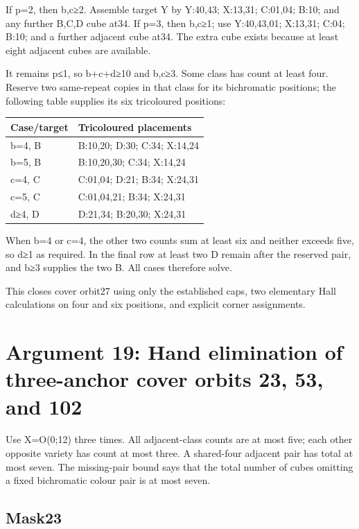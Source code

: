 \documentclass[
  10pt,
]{article}
\begin{document}
If p=2, then b,c≥2. Assemble target Y by Y:40,43; X:13,31; C:01,04;
B:10; and any further B,C,D cube at34. If p=3, then b,c≥1; use
Y:40,43,01; X:13,31; C:04; B:10; and a further adjacent cube at34. The
extra cube exists because at least eight adjacent cubes are available.

It remains p≤1, so b+c+d≥10 and b,c≥3. Some class has count at least
four. Reserve two same-repeat copies in that class for its bichromatic
positions; the following table supplies its six tricoloured positions:

\begin{longtable}[]{@{}ll@{}}
\toprule\noalign{}
Case/target & Tricoloured placements \\
\midrule\noalign{}
\endhead
\bottomrule\noalign{}
\endlastfoot
b=4, B & B:10,20; D:30; C:34; X:14,24 \\
b=5, B & B:10,20,30; C:34; X:14,24 \\
c=4, C & C:01,04; D:21; B:34; X:24,31 \\
c=5, C & C:01,04,21; B:34; X:24,31 \\
d≥4, D & D:21,34; B:20,30; X:24,31 \\
\end{longtable}

When b=4 or c=4, the other two counts sum at least six and neither
exceeds five, so d≥1 as required. In the final row at least two D remain
after the reserved pair, and b≥3 supplies the two B. All cases therefore
solve.

This closes cover orbit27 using only the established caps, two
elementary Hall calculations on four and six positions, and explicit
corner assignments.

\hypertarget{arg-19}{%
\section{Argument 19: Hand elimination of three-anchor cover orbits 23,
53, and 102}\label{arg-19}}

Use X=O(0;12) three times. All adjacent-class counts are at
most five; each other opposite variety has count at most three. A
shared-four adjacent pair has total at most seven. The missing-pair
bound says that the total number of cubes omitting a fixed bichromatic
colour pair is at most seven.

\hypertarget{mask23}{%
\subsection*{Mask23}\label{mask23}}
\end{document}

